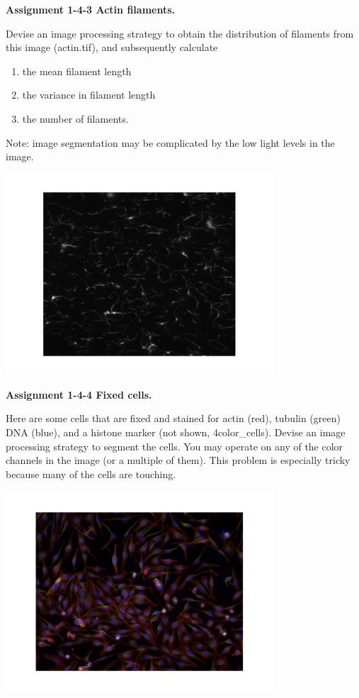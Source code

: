 \textbf{\sffamily
Assignment 1-4-3  Actin filaments.}

Devise an image processing strategy to
obtain the distribution of filaments from this image (actin.tif), and subsequently
calculate 
\begin{enumerate}
\item the mean filament length
\item the variance in filament length
\item the number of filaments. 
\end{enumerate}
Note: image segmentation may be complicated by the low light levels in the image. \\

{\centering 
\includegraphics[width=10cm]{img/CMCIBasicCourse201102-img127.jpg}
\par}

\textbf{\sffamily
Assignment 1-4-4  Fixed cells.}

Here are some cells that are fixed and
stained for actin (red), tubulin (green) DNA (blue), and a histone
marker (not shown, 4color\_cells). Devise an image processing strategy to segment
the cells. You may operate on any of the color channels in the image
(or a multiple of them). This problem is especially tricky because
many of the cells are touching.  \\

{\centering 
\includegraphics[width=10cm]{img/CMCIBasicCourse201102-img128.jpg}
\par}

